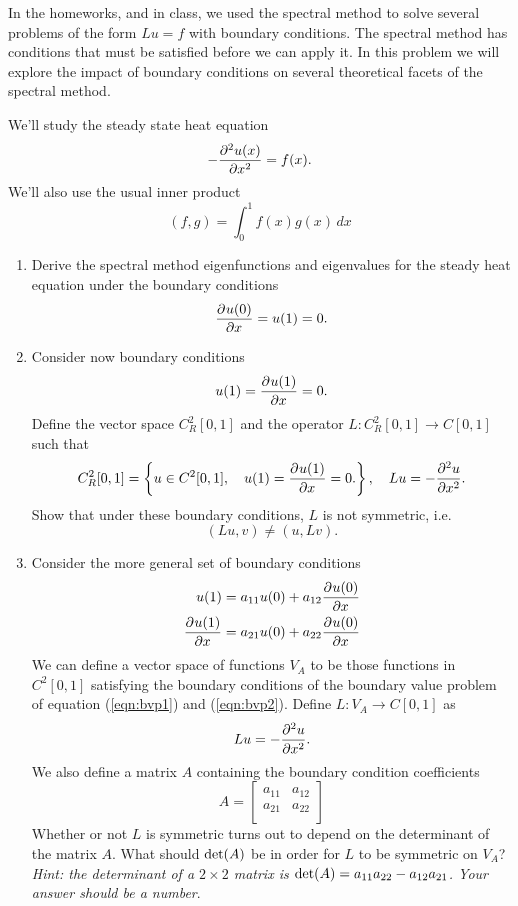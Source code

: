 In the homeworks, and in class, we used the spectral method to solve several problems of the form $Lu = f$ with boundary conditions.   The spectral method has conditions that must be satisfied before we can apply it.  In this problem we will explore the impact of boundary conditions on several theoretical facets of the spectral method.

We'll study the steady state heat equation
\[
-\frac{\partial^{2} u(x)}{\partial x^{2}} = f(x).  
\]
We'll also use the usual inner product 
\[
(f,g) = \int_{0}^{1} f(x)g(x)\, dx
\]

\begin{enumerate}
\item Derive the spectral method eigenfunctions and eigenvalues for the steady heat equation under the boundary conditions
\[
\frac{\partial^{} u(0)}{\partial x^{}} = u(1) = 0.
\]
\item Consider now boundary conditions 
\[
u(1) =  \frac{\partial^{} u(1)}{\partial x^{}} = 0.
\]
Define the vector space $C^2_R[0,1]$ and the operator $L: C^2_R[0,1]\rightarrow C[0,1]$ such that 
\[
C^2_R[0,1] = \left\{ u\in C^2[0,1], \quad u(1)= \frac{\partial^{} u(1)}{\partial x^{}} = 0.\right\}, \quad Lu = -\frac{\partial^{2} u}{\partial x^{2}}.
\]
Show that under these boundary conditions, $L$ is not symmetric, i.e.
\[
(Lu,v) \neq (u,Lv).
\]
\item Consider the more general set of boundary conditions
\begin{align}
       u(1) &= a_{11} u(0) + a_{12} \frac{\partial^{} u(0)}{\partial x^{}}             \label{eqn:bvp1}\\
      \frac{\partial^{} u(1)}{\partial x^{}} &= a_{21} u(0) + a_{22}\frac{\partial^{} u(0)}{\partial x^{}}\label{eqn:bvp2}
\end{align}
We can define a vector space of functions $V_A$ to be those functions in $C^{2}[0,1]$ satisfying the boundary conditions of the boundary value problem of equation (\ref{eqn:bvp1}) and (\ref{eqn:bvp2}). %
 Define $L:V_A \rightarrow C[0,1]$ as 
\[
Lu = -\frac{\partial^{2} u}{\partial x^{2}}.
\]
We also define a matrix $A$ containing the boundary condition coefficients
\[
 A = \left[
     \begin{array}{cc}
       a_{11} & a_{12} \\
      a_{21} & a_{22}\\
     \end{array}
   \right]
\]
Whether or not $L$ is symmetric turns out to depend on the determinant of the matrix $A$.  What should ${\rm det}(A)$ be in order for $L$ to be symmetric on $V_A$? \emph{Hint: the determinant of a $2\times 2$ matrix is ${\rm det}(A) = a_{11}a_{22} - a_{12}a_{21}$.  Your answer should be a number}.  


\end{enumerate}
